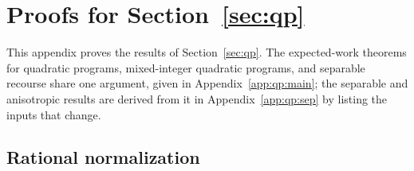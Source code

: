 \section{Proofs for Section~\ref{sec:qp}}\label{app:qp}

This appendix proves the results of Section~\ref{sec:qp}. The expected-work
theorems for quadratic programs, mixed-integer quadratic programs, and
separable recourse share one argument, given in Appendix~\ref{app:qp:main};
the separable and anisotropic results are derived from it in
Appendix~\ref{app:qp:sep} by listing the inputs that change.

\subsection{Rational normalization}\label{app:qp:normalize}

